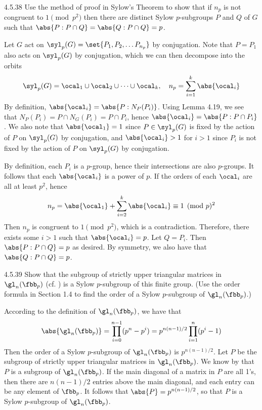 \begin{exercise}{4.5.38}
	Use the method of proof in Sylow's Theorem to show that if $n_p$ is not congruent to $1 \pmod p^2$ then there are distinct Sylow $p$-subgroups $P$ and $Q$ of $G$ such that $\abs{P : P \cap Q} = \abs{Q : P \cap Q} = p$.
\end{exercise}

\begin{sol}
	Let $G$ act on $\syl_p(G) = \set{P_1, P_2, \ldots P_{n_p}}$ by conjugation.
	Note that $P = P_1$ also acts on $\syl_p(G)$ by conjugation, which we can then decompose into the orbits
	\[
		\syl_p(G) = \ocal_1 \cup \ocal_2 \cup \cdots \cup \ocal_k, \quad n_p = \sum_{i = 1}^k \abs{\ocal_i}
	\]
	By definition, $\abs{\ocal_i} = \abs{P : N_P(P_i)}$.
	Using Lemma 4.19, we see that $N_P(P_i) = P \cap N_G(P_i) = P \cap P_i$, hence $\abs{\ocal_i} = \abs{P : P \cap P_i}$.
	We also note that $\abs{\ocal_1} = 1$ since $P \in \syl_p(G)$ is fixed by the action of $P$ on $\syl_p(G)$ by conjugation, and $\abs{\ocal_i} > 1$ for $i > 1$ since $P_i$ is not fixed by the action of $P$ on $\syl_p(G)$ by conjugation.

	By definition, each $P_i$ is a $p$-group, hence their intersections are also $p$-groups.
	It follows that each $\abs{\ocal_i}$ is a power of $p$.
	If the orders of each $\ocal_i$ are all at least $p^2$, hence
	\[
		n_p = \abs{\ocal_1} + \sum_{i = 2}^k \abs{\ocal_i} \equiv 1 \pmod p^2
	\]
	Then $n_p$ is congruent to $1 \pmod p^2$, which is a contradiction.
	Therefore, there exists some $i > 1$ such that $\abs{\ocal_i} = p$.
	Let $Q = P_i$.
	Then $\abs{P : P \cap Q} = p$ as desired.
	By symmetry, we also have that $\abs{Q : P \cap Q} = p$.
\end{sol}

\begin{exercise}{4.5.39}
	Show that the subgroup of strictly upper triangular matrices in $\gl_n(\fbb_p)$ (cf. ) is a Sylow $p$-subgroup of this finite group. (Use the order formula in Section 1.4 to find the order of a Sylow $p$-subgroup of $\gl_n(\fbb_p)$.)
\end{exercise}

\begin{sol}
	According to the definition of $\gl_n(\fbb_p)$, we have that
	\[
		\abs{\gl_n(\fbb_p)} = \prod_{i = 0}^{n-1} (p^n - p^i) = p^{n(n - 1)/2} \prod_{i = 1}^n (p^i - 1)
	\]
	Then the order of a Sylow $p$-subgroup of $\gl_n(\fbb_p)$ is $p^{n(n - 1)/2}$.
	Let $P$ be the subgroup of strictly upper triangular matrices in $\gl_n(\fbb_p)$.
	We know by  that $P$ is a subgroup of $\gl_n(\fbb_p)$.
	If the main diagonal of a matrix in $P$ are all 1's, then there are $n(n - 1)/2$ entries above the main diagonal, and each entry can be any element of $\fbb_p$.
	It follows that $\abs{P} = p^{n(n - 1)/2}$, so that $P$ is a Sylow $p$-subgroup of $\gl_n(\fbb_p)$.
\end{sol}

